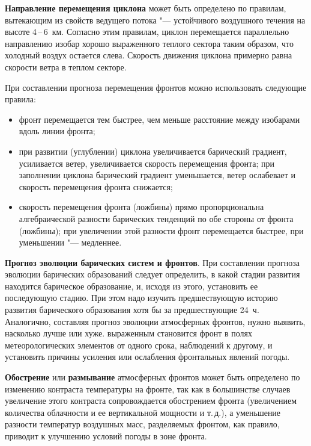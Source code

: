 \documentclass[a4paper, 12pt, twoside, final, book, russian, fittopage, cyremdash, openright]{ncc}
\newcommand{\otdo}{\,--\,}
\begin{document}
\textbf{Направление перемещения циклона} может быть определено по правилам, вытекающим из свойств
ведущего потока "--- устойчивого воздушного течения на высоте 4\otdo6~км.
Согласно этим правилам, циклон перемещается параллельно
направлению изобар хорошо выраженного теплого сектора таким образом,
что холодный воздух остается слева. Скорость движения циклона примерно
равна скорости ветра в теплом секторе.

При составлении прогноза перемещения фронтов можно использовать
следующие правила:
\begin{itemize}
\item фронт перемещается тем быстрее, чем меньше расстояние между
  изобарами вдоль линии фронта;
\item при развитии (углублении) циклона увеличивается барический
  градиент, усиливается ветер, увеличивается скорость перемещения
  фронта; при заполнении циклона барический градиент уменьшается,
  ветер ослабевает и скорость перемещения фронта снижается;
\item скорость перемещения фронта (ложбины) прямо пропорциональна
  алгебраической разности барических тенденций по обе стороны от
  фронта (ложбины); при увеличении этой разности фронт перемещается
  быстрее, при уменьшении "--- медленнее.
\end{itemize}

\textbf{Прогноз эволюции барических систем и фронтов}. При составлении прогноза
эволюции барических образований следует определить, в какой стадии
развития находится барическое образование, и, исходя из этого,
установить ее последующую стадию. При этом надо изучить предшествующую
историю развития барического образования хотя бы за предшествующие
24~ч. Аналогично, составляя прогноз эволюции атмосферных фронтов,
нужно выявить, насколько лучше или хуже. выраженным становится фронт в
полях метеорологических элементов от одного срока, наблюдений к
другому, и установить причины усиления или ослабления фронтальных
явлений погоды.

\textbf{Обострение} или
\textbf{размывание} атмосферных фронтов может
быть определено по изменению контраста температуры на фронте, так как
в большинстве случаев увеличение этого контраста сопровождается
обострением фронта (увеличением количества облачности и ее
вертикальной мощности и т.\,д.), а уменьшение разности температур
воздушных масс, разделяемых фронтом, как правило, приводит к улучшению
условий погоды в зоне фронта.
\end{document}
